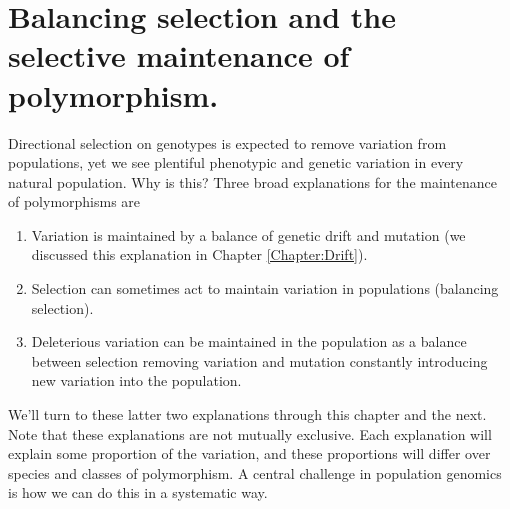 \section{Balancing selection and the selective maintenance of polymorphism.}
Directional selection on genotypes is expected to remove variation
from populations, yet we see plentiful phenotypic and genetic
variation in every natural population. Why is this? Three broad
explanations for the maintenance of polymorphisms are
\begin{enumerate}
\item Variation is maintained by a balance of genetic drift and
  mutation (we discussed this explanation in Chapter
  \ref{Chapter:Drift}).
  \item Selection can sometimes act to maintain variation in
    populations (balancing selection). 
    \item Deleterious variation can be maintained in the population as
      a balance between selection removing variation and mutation
      constantly introducing new variation into the population. 
\end{enumerate}
We'll turn to these latter two explanations through this chapter and
the next.
Note that these explanations are not mutually exclusive. Each
explanation will explain some proportion of the variation, and these
proportions will differ over species and classes of polymorphism. A
central challenge in population genomics is how we can do this in a
systematic way.
